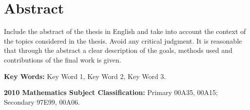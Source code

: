 \chapter*{Abstract}

Include the abstract of the thesis in English and take into account the context of
the topics considered in the thesis.
Avoid any critical judgment.
It is reasonable that through the abstract a clear description of the goals,
methods used and contributions of the final work is given.

\bigskip
\textbf{Key Words:}
Key Word 1, Key Word 2, Key Word 3.

\bigskip
\textbf{2010 Mathematics Subject Classification:}
Primary 00A35, 00A15;  Secondary 97E99, 00A06.

\setcounter{page}{4}

